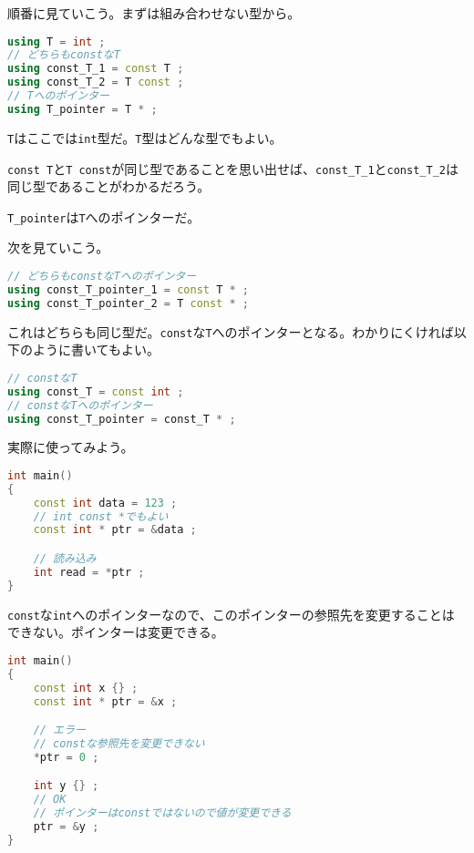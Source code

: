 順番に見ていこう。まずは組み合わせない型から。

\begin{lstlisting}[language={C++}]
using T = int ;
// どちらもconstなT
using const_T_1 = const T ;
using const_T_2 = T const ;
// Tへのポインター
using T_pointer = T * ;
\end{lstlisting}

\texttt{T}はここでは\texttt{int}型だ。\texttt{T}型はどんな型でもよい。

\texttt{const T}と\texttt{T const}が同じ型であることを思い出せば、\texttt{const\_T\_1}と\texttt{const\_T\_2}は同じ型であることがわかるだろう。

\texttt{T\_pointer}は\texttt{T}へのポインターだ。

次を見ていこう。

\begin{lstlisting}[language={C++}]
// どちらもconstなTへのポインター
using const_T_pointer_1 = const T * ;
using const_T_pointer_2 = T const * ;
\end{lstlisting}

これはどちらも同じ型だ。\texttt{const}な\texttt{T}へのポインターとなる。わかりにくければ以下のように書いてもよい。

\ifTombow\pagebreak\fi
\begin{lstlisting}[language={C++}]
// constなT
using const_T = const int ;
// constなTへのポインター
using const_T_pointer = const_T * ;
\end{lstlisting}

実際に使ってみよう。

\begin{lstlisting}[language={C++}]
int main()
{
    const int data = 123 ;
    // int const *でもよい
    const int * ptr = &data ;

    // 読み込み
    int read = *ptr ;
}
\end{lstlisting}

\texttt{const}な\texttt{int}へのポインターなので、このポインターの参照先を変更することはできない。ポインターは変更できる。

\begin{lstlisting}[language={C++}]
int main()
{
    const int x {} ;
    const int * ptr = &x ;

    // エラー
    // constな参照先を変更できない
    *ptr = 0 ;

    int y {} ;
    // OK
    // ポインターはconstではないので値が変更できる
    ptr = &y ;
}
\end{lstlisting}

